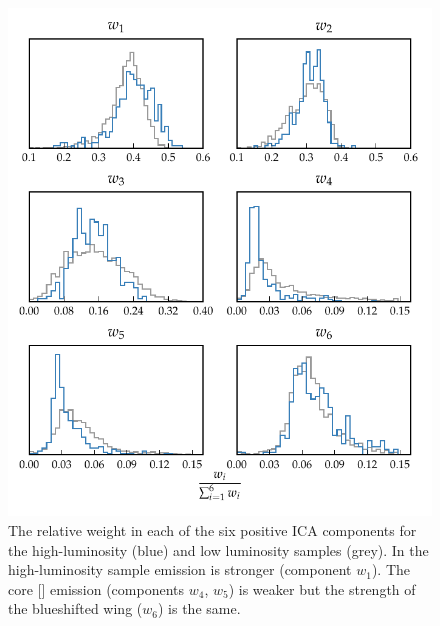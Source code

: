 \begin{figure}
    \includegraphics[width=\textwidth]{figures/chapter04/mfica_component_weights.pdf} 
    \caption[{The relative weight in each of the six positive \ac{ICA} components for the high-luminosity and low luminosity samples.}]{The relative weight in each of the six positive \ac{ICA} components for the high-luminosity (blue) and low luminosity samples (grey). In the high-luminosity sample  emission is stronger (component $w_1$). The core [] emission (components $w_4$, $w_5$) is weaker but the strength of the blueshifted wing ($w_6$) is the same.}     
    \label{fig:mfica_component_weights}
\end{figure}

